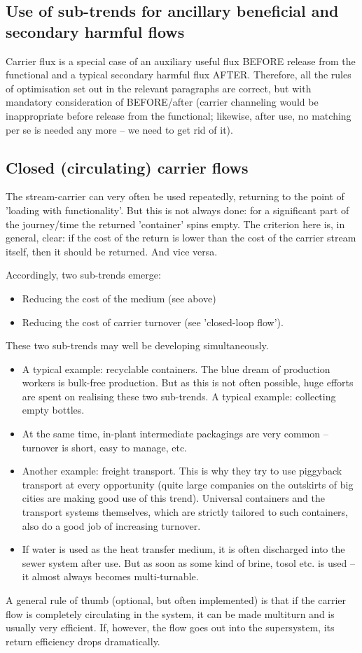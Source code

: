 \documentclass[a4paper,11pt]{article}
\begin{document}
\subsection{Use of sub-trends for ancillary beneficial and secondary harmful
  flows} 

Carrier flux is a special case of an auxiliary useful flux BEFORE release from
the functional and a typical secondary harmful flux AFTER. Therefore, all the
rules of optimisation set out in the relevant paragraphs are correct, but with
mandatory consideration of BEFORE/after (carrier channeling would be
inappropriate before release from the functional; likewise, after use, no
matching per se is needed any more -- we need to get rid of it).

\subsection{Closed (circulating) carrier flows}

The stream-carrier can very often be used repeatedly, returning to the point
of 'loading with functionality'. But this is not always done: for a
significant part of the journey/time the returned 'container' spins empty. The
criterion here is, in general, clear: if the cost of the return is lower than
the cost of the carrier stream itself, then it should be returned. And vice
versa.

Accordingly, two sub-trends emerge:
\begin{itemize}
\item Reducing the cost of the medium (see above)
\item Reducing the cost of carrier turnover (see 'closed-loop flow').
\end{itemize}
These two sub-trends may well be developing simultaneously.
\begin{itemize}
\item A typical example: recyclable containers. The blue dream of production
  workers is bulk-free production. But as this is not often possible, huge
  efforts are spent on realising these two sub-trends. A typical example:
  collecting empty bottles.
\item At the same time, in-plant intermediate packagings are very common --
  turnover is short, easy to manage, etc.
\item Another example: freight transport. This is why they try to use
  piggyback transport at every opportunity (quite large companies on the
  outskirts of big cities are making good use of this trend). Universal
  containers and the transport systems themselves, which are strictly tailored
  to such containers, also do a good job of increasing turnover.
\item If water is used as the heat transfer medium, it is often discharged
  into the sewer system after use. But as soon as some kind of brine, tosol
  etc. is used -- it almost always becomes multi-turnable.
\end{itemize}
A general rule of thumb (optional, but often implemented) is that if the
carrier flow is completely circulating in the system, it can be made multiturn
and is usually very efficient. If, however, the flow goes out into the
supersystem, its return efficiency drops dramatically.
\end{document}
